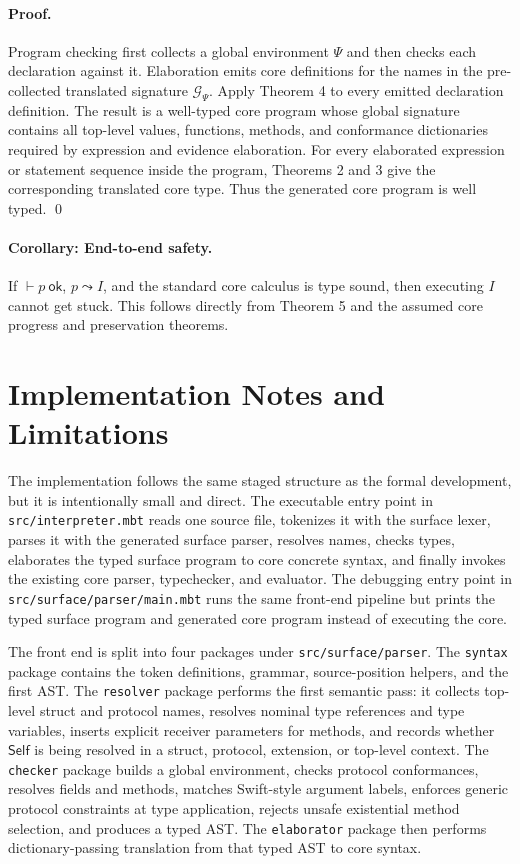 \documentclass[manuscript,nonacm]{acmart}
\newcommand{\kw}[1]{\ensuremath{\mathsf{#1}}}
\newcommand{\Self}{\kw{Self}\xspace}
\newcommand{\ok}{\ \kw{ok}}
\newcommand{\has}{\vdash}
\newcommand{\elab}{\leadsto}
\begin{document}
\paragraph{Proof.}
Program checking first collects a global environment $\Psi$ and then checks each declaration against it.
Elaboration emits core definitions for the names in the pre-collected translated signature $\mathcal{G}_\Psi$.
Apply Theorem 4 to every emitted declaration definition.
The result is a well-typed core program whose global signature contains all top-level values, functions, methods, and conformance dictionaries required by expression and evidence elaboration.
For every elaborated expression or statement sequence inside the program, Theorems 2 and 3 give the corresponding translated core type.
Thus the generated core program is well typed.
\qed

\paragraph{Corollary: End-to-end safety.}
If $\has p\ok$, $p\elab I$, and the standard core calculus is type sound, then executing $I$ cannot get stuck.
This follows directly from Theorem 5 and the assumed core progress and preservation theorems.

\section{Implementation Notes and Limitations}

The implementation follows the same staged structure as the formal development, but it is intentionally small and direct.
The executable entry point in \texttt{src/interpreter.mbt} reads one source file, tokenizes it with the surface lexer, parses it with the generated surface parser, resolves names, checks types, elaborates the typed surface program to core concrete syntax, and finally invokes the existing core parser, typechecker, and evaluator.
The debugging entry point in \texttt{src/surface/parser/main.mbt} runs the same front-end pipeline but prints the typed surface program and generated core program instead of executing the core.

The front end is split into four packages under \texttt{src/surface/parser}.
The \texttt{syntax} package contains the token definitions, grammar, source-position helpers, and the first AST.
The \texttt{resolver} package performs the first semantic pass:
it collects top-level struct and protocol names, resolves nominal type references and type variables, inserts explicit receiver parameters for methods, and records whether \Self is being resolved in a struct, protocol, extension, or top-level context.
The \texttt{checker} package builds a global environment, checks protocol conformances, resolves fields and methods, matches Swift-style argument labels, enforces generic protocol constraints at type application, rejects unsafe existential method selection, and produces a typed AST.
The \texttt{elaborator} package then performs dictionary-passing translation from that typed AST to core syntax.
\end{document}
